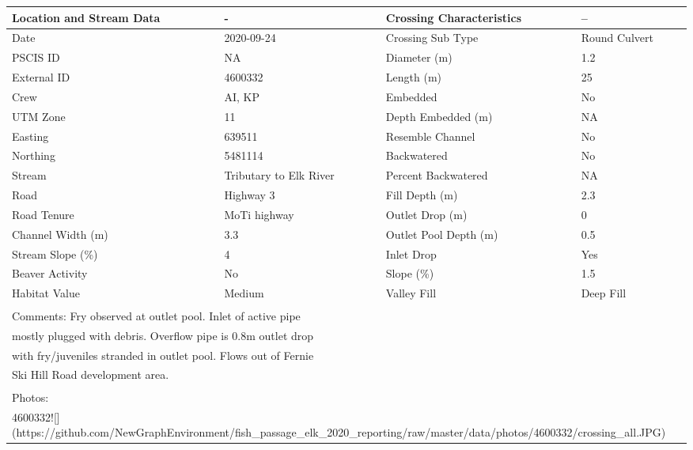 \documentclass[
]{book}
\begin{document}
\begin{tabular}{l|l|l|l}
\hline
Location and Stream Data & - & Crossing Characteristics & --\\
\hline
Date & 2020-09-24 & Crossing Sub Type & Round Culvert\\
\hline
PSCIS ID & NA & Diameter (m) & 1.2\\
\hline
External ID & 4600332 & Length (m) & 25\\
\hline
Crew & AI, KP & Embedded & No\\
\hline
UTM Zone & 11 & Depth Embedded (m) & NA\\
\hline
Easting & 639511 & Resemble Channel & No\\
\hline
Northing & 5481114 & Backwatered & No\\
\hline
Stream & Tributary to Elk River & Percent Backwatered & NA\\
\hline
Road & Highway 3 & Fill Depth (m) & 2.3\\
\hline
Road Tenure & MoTi highway & Outlet Drop (m) & 0\\
\hline
Channel Width (m) & 3.3 & Outlet Pool Depth (m) & 0.5\\
\hline
Stream Slope (\%) & 4 & Inlet Drop & Yes\\
\hline
Beaver Activity & No & Slope (\%) & 1.5\\
\hline
Habitat Value & Medium & Valley Fill & Deep Fill\\
\hline
\multicolumn{4}{l}{\textsuperscript{} Comments: Fry observed at outlet pool.  Inlet of active pipe}\\
\multicolumn{4}{l}{mostly plugged with debris. Overflow pipe is 0.8m outlet drop}\\
\multicolumn{4}{l}{with fry/juveniles stranded in outlet pool.  Flows out of Fernie}\\
\multicolumn{4}{l}{Ski Hill Road development area.}\\
\multicolumn{4}{l}{\textsuperscript{} Photos:}\\
\multicolumn{4}{l}{4600332![](https://github.com/NewGraphEnvironment/fish\_passage\_elk\_2020\_reporting/raw/master/data/photos/4600332/crossing\_all.JPG)}\\
\end{tabular}
\end{document}
